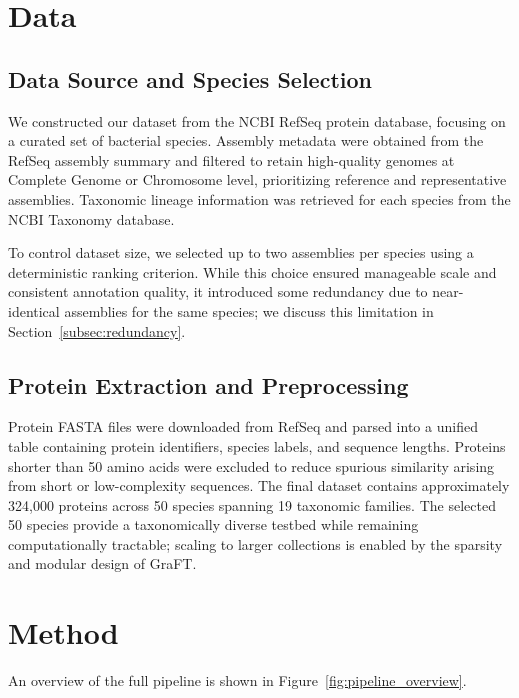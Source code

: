 \documentclass[11pt]{article}
\begin{document}
\section{Data}

\subsection{Data Source and Species Selection}

We constructed our dataset from the NCBI RefSeq protein database\cite{OLeary2016,RefSeqGenome}, focusing on a curated set of bacterial species. Assembly metadata were obtained from the RefSeq assembly summary and filtered to retain high-quality genomes at Complete Genome or Chromosome level, prioritizing reference and representative assemblies. Taxonomic lineage information was retrieved for each species from the NCBI Taxonomy database\cite{NCBITaxonomy}.

To control dataset size, we selected up to two assemblies per species using a deterministic ranking criterion. While this choice ensured manageable scale and consistent annotation quality, it introduced some redundancy due to near-identical assemblies for the same species; we discuss this limitation in Section~\ref{subsec:redundancy}.

\subsection{Protein Extraction and Preprocessing}

Protein FASTA files were downloaded from RefSeq and parsed into a unified table containing protein identifiers, species labels, and sequence lengths. Proteins shorter than 50 amino acids were excluded to reduce spurious similarity arising from short or low-complexity sequences. The final dataset contains approximately 324,000 proteins across 50 species spanning 19 taxonomic families. The selected 50 species provide a taxonomically diverse testbed while remaining computationally tractable; scaling to larger collections is enabled by the sparsity and modular design of GraFT.

\section{Method}

An overview of the full pipeline is shown in Figure~\ref{fig:pipeline_overview}.
\end{document}
